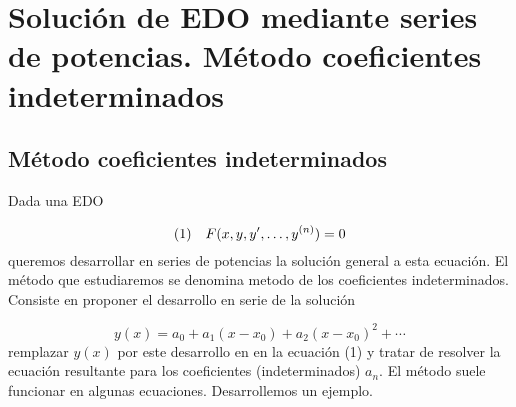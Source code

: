 \documentclass{article}
\newcounter{lem_cont}
\newcounter{ejem_cont}
\renewcommand{\emph}[1]{\textcolor[rgb]{0,0,1}{#1}}
\begin{document}
\section{Solución de EDO mediante series de potencias. Método coeficientes indeterminados}



\subsection{Método coeficientes indeterminados}

Dada una EDO

\begin{equation} \hbox{(1)}\quad  F(x,y,y',\ldots,y^{(n)})=0\end{equation}
queremos desarrollar en series de potencias  la solución general a esta ecuación. El método que estudiaremos se denomina \emph{metodo de los coeficientes indeterminados}. Consiste en proponer el desarrollo en serie de la solución

\[y(x)=a_0+a_1(x-x_0)+a_2(x-x_0)^2+\cdots  \]
remplazar $y(x)$ por este desarrollo en  en la ecuación (1) y tratar de resolver la ecuación resultante para los coeficientes (indeterminados) $a_n$. El método suele funcionar en algunas ecuaciones. Desarrollemos un ejemplo.

 
\end{document}
